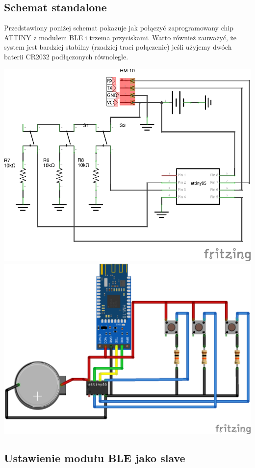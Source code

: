 \documentclass[eng,printmode]{mgr}
\begin{document}
\pagebreak
\subsection{Schemat standalone}

Przedstawiony poniżej schemat pokazuje jak połączyć zaprogramowany chip ATTINY z modułem BLE i trzema przyciskami.
Warto również zauważyć, że system jest bardziej stabilny (rzadziej traci połączenie) jeśli użyjemy dwóch baterii CR2032 podłączonych równolegle.

\includegraphics[width=\textwidth]{nadajnik-schem}
\newpage
\includegraphics[width=\textwidth]{nadajnik-bb}
\subsection{Ustawienie modułu BLE jako slave}
\end{document}
